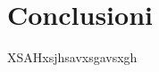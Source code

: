 \documentclass{article}                                                                                                     %
\begin{document}
\section{Conclusioni}                                                                                                       %
\label{sec:conclusions}                                                                                                     %
  XSAHxsjhsavxsgavsxgh                                                                                                      %

\end{document}
